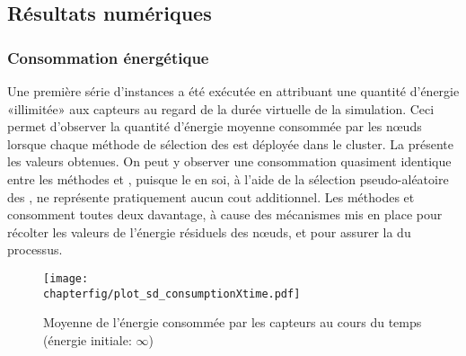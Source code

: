 

\pagebreak %

    \subsection{Résultats numériques}

        \subsubsection{Consommation énergétique}

Une première série d'instances a été exécutée en attribuant une quantité d'énergie «illimitée» aux capteurs au regard de la durée virtuelle de la simulation.
Ceci permet d'observer la quantité d'énergie moyenne consommée par les nœuds lorsque chaque méthode de sélection des \cns est déployée dans le cluster.
La  présente les valeurs obtenues.
On peut y observer une consommation quasiment identique entre les méthodes \idstat et \idrand, puisque le  en soi, à l'aide de la sélection pseudo-aléatoire des \cns, ne représente pratiquement aucun cout additionnel.
Les méthodes \ideres et \iddemx consomment toutes deux davantage, à cause des mécanismes mis en place pour récolter les valeurs de l'énergie résiduels des nœuds, et pour assurer la \secu du processus.
\begin{figure}[!hb]
    \centering
    \texttt{[image: \\chapterfig/plot\_sd\_consumptionXtime.pdf]}
    \caption[Moyenne de l'énergie consommée par les capteurs au cours du temps]{Moyenne de l'énergie consommée par les capteurs au cours du temps (énergie initiale: $\infty$)}\label{sd:fig:cons-inf}
\end{figure}

